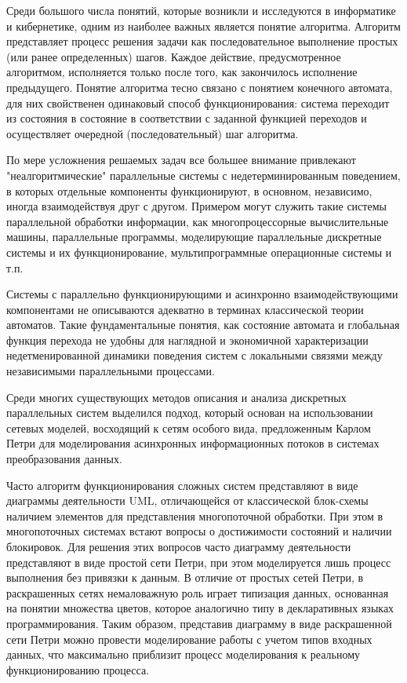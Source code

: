 \Introduction

Среди большого числа понятий, которые возникли и исследуются в информатике и кибернетике, одним из наиболее важных является понятие алгоритма. Алгоритм представляет процесс решения задачи как последовательное выполнение простых (или ранее определенных) шагов. Каждое действие, предусмотренное алгоритмом, исполняется только после того, как закончилось исполнение предыдущего. Понятие алгоритма тесно связано с понятием конечного автомата, для них свойственен одинаковый способ функционирования: система переходит из состояния в состояние в соответствии с заданной функцией переходов и осуществляет очередной (последовательный) шаг алгоритма.

По мере усложнения решаемых задач все большее внимание привлекают "неалгоритмические" параллельные системы с недетерминированным поведением, в которых отдельные компоненты функционируют, в основном, независимо, иногда взаимодействуя друг с другом. Примером могут служить такие системы параллельной обработки информации, как многопроцессорные вычислительные машины, параллельные программы, моделирующие параллельные дискретные системы и их функционирование, мультипрограммные операционные системы и т.п.

Системы с параллельно функционирующими и асинхронно взаимодействующими компонентами не описываются адекватно в терминах классической теории автоматов. Такие фундаментальные понятия, как состояние автомата и глобальная функция перехода не удобны для наглядной и экономичной характеризации недетменированной динамики поведения систем с локальными связями между независимыми параллельными процессами.

Среди многих существующих методов описания и анализа дискретных параллельных систем выделился подход, который основан на использовании сетевых моделей, восходящий к сетям особого вида, предложенным Карлом Петри для моделирования асинхронных информационных потоков в системах преобразования данных.

Часто алгоритм функционирования сложных систем представляют в виде диаграммы деятельности UML, отличающейся от классической блок-схемы наличием элементов для представления многопоточной обработки. При этом в многопоточных системах встают вопросы о достижимости состояний и наличии блокировок. Для решения этих вопросов часто диаграмму деятельности представляют в виде простой сети Петри, при этом моделируется лишь процесс выполнения без привязки к данным. В отличие от простых сетей Петри, в раскрашенных сетях немаловажную роль играет типизация данных, основанная на понятии множества цветов, которое аналогично типу в декларативных языках программирования. Таким образом, представив диаграмму в виде раскрашенной сети Петри можно провести моделирование работы с учетом типов входных данных, что максимально приблизит процесс моделирования к реальному функционированию процесса.

